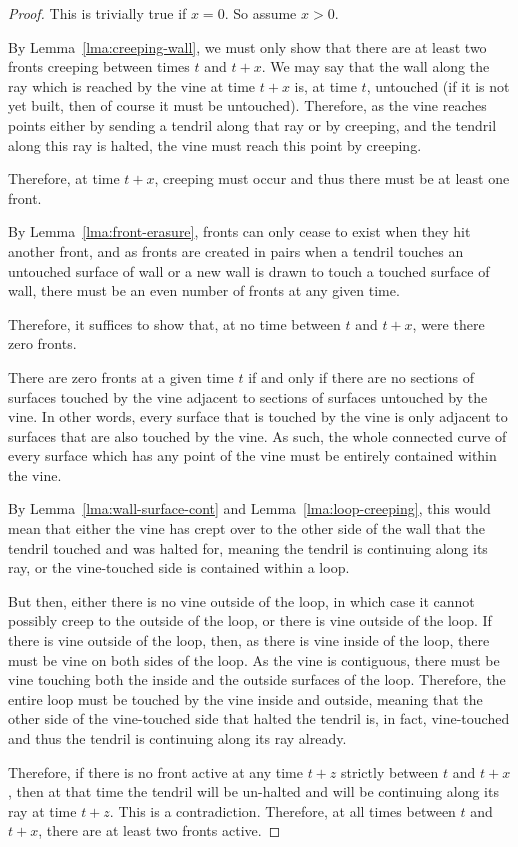 \documentclass[10pt,a4paper]{amsart}
\begin{document}
\begin{proof}[Proof]
This is trivially true if \(x=0\). So assume \(x>0\). 

By Lemma~\ref{lma:creeping-wall}, we must only show that there are at least two fronts creeping between times \(t\) and \(t+x\). We may say that the wall along the ray which is reached by the vine at time \(t+x\) is, at time \(t\), untouched (if it is not yet built, then of course it must be untouched). Therefore, as the vine reaches points either by sending a tendril along that ray or by creeping, and the tendril along this ray is halted, the vine must reach this point by creeping. 

Therefore, at time \(t+x\), creeping must occur and thus there must be at least one front. 

By Lemma~\ref{lma:front-erasure}, fronts can only cease to exist when they hit another front, and as fronts are created in pairs when a tendril touches an untouched surface of wall or a new wall is drawn to touch a touched surface of wall, there must be an even number of fronts at any given time. 

Therefore, it suffices to show that, at no time between \(t\) and \(t+x\), were there zero fronts. 

There are zero fronts at a given time \(t\) if and only if there are no sections of surfaces touched by the vine adjacent to sections of surfaces untouched by the vine. In other words, every surface that is touched by the vine is only adjacent to surfaces that are also touched by the vine. As such, the whole connected curve of every surface which has any point of the vine must be entirely contained within the vine. 

By Lemma~\ref{lma:wall-surface-cont} and Lemma~\ref{lma:loop-creeping}, this would mean that either the vine has crept over to the other side of the wall that the tendril touched and was halted for, meaning the tendril is continuing along its ray, or the vine-touched side is contained within a loop. 

But then, either there is no vine outside of the loop, in which case it cannot possibly creep to the outside of the loop, or there is vine outside of the loop. If there is vine outside of the loop, then, as there is vine inside of the loop, there must be vine on both sides of the loop. As the vine is contiguous, there must be vine touching both the inside and the outside surfaces of the loop. Therefore, the entire loop must be touched by the vine inside and outside, meaning that the other side of the vine-touched side that halted the tendril is, in fact, vine-touched and thus the tendril is continuing along its ray already. 

Therefore, if there is no front active at any time \(t+z\) strictly between \(t\) and \(t+x\), then at that time the tendril will be un-halted and will be continuing along its ray at time \(t+z\). This is a contradiction. Therefore, at all times between \(t\) and \(t+x\), there are at least two fronts active. 
\end{proof}
\end{document}
